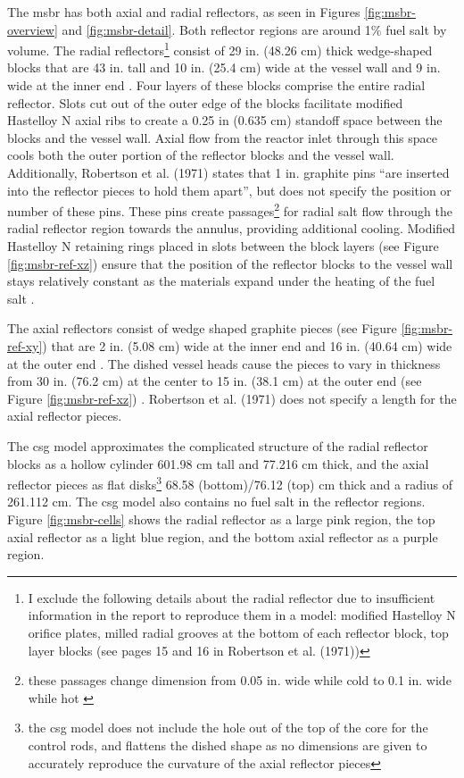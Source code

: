 The \Gls{msbr} has both axial and radial reflectors, as seen in Figures
\ref{fig:msbr-overview} and \ref{fig:msbr-detail}. Both reflector regions are around 1\% fuel salt by volume. The radial
reflectors\footnote{I exclude the following details about the radial reflector
due to insufficient information in the report to reproduce them in a model:
modified Hastelloy N orifice plates, milled radial grooves at the bottom of each
reflector block, top layer blocks (see pages 15 and 16 in Robertson et al.
(1971))} consist of 29 in. (48.26 cm) thick wedge-shaped blocks that are 43 in. tall and 10 in. (25.4 cm) wide at the vessel wall and 9 in. wide at the inner end \cite{robertson_conceptual_1971}.
Four layers of these blocks comprise the entire radial reflector. Slots cut out
of the outer edge of the blocks facilitate modified Hastelloy N axial ribs to create a
0.25 in (0.635 cm) standoff space between the blocks and the vessel wall. Axial
flow from the reactor inlet through this space cools both the outer portion of
the reflector blocks and the vessel wall. Additionally, Robertson et al. (1971)
states that 1 in. graphite pins ``are inserted into the reflector pieces to hold
them apart'', but does not specify the position or number of these pins. These
pins create passages\footnote{these passages change dimension from 0.05 in. wide
while cold to 0.1 in. wide while hot \cite{robertson_conceptual_1971}} for
radial salt flow through the radial reflector region towards the annulus,
providing additional cooling. Modified Hastelloy N retaining rings placed in slots
between the block layers (see Figure \ref{fig:msbr-ref-xz}) ensure that the
position of the reflector blocks to the vessel wall stays relatively constant as
the materials expand under the heating of the fuel salt
\cite{robertson_conceptual_1971}.

The axial reflectors consist of wedge shaped graphite pieces (see Figure
\ref{fig:msbr-ref-xy}) that are 2 in. (5.08 cm) wide at the inner end and 16 in.
(40.64 cm) wide at the outer end \cite{robertson_conceptual_1971}. The dished
vessel heads cause the pieces to vary in thickness from 30 in. (76.2 cm) at the
center to 15 in. (38.1 cm) at the outer end (see Figure
\ref{fig:msbr-ref-xz}) \cite{robertson_conceptual_1971}. Robertson et al. (1971)
does not specify a length for the axial reflector pieces. 

The \Gls{csg} model approximates the complicated structure of the radial
reflector blocks as a hollow cylinder 601.98 cm tall and 77.216 cm thick, and
the axial reflector pieces as flat disks\footnote{the \Gls{csg} model does not
include the hole out of the top of the core for the control rods, and flattens
the dished shape as no dimensions are given to accurately reproduce the curvature
of the axial reflector pieces} 68.58 (bottom)/76.12 (top) cm thick and a radius
of 261.112 cm. The \Gls{csg} model also contains no fuel salt in the reflector
regions. Figure \ref{fig:msbr-cells} shows the radial reflector as a large pink
region, the top axial reflector as a light blue region, and the bottom axial
reflector as a purple region.

